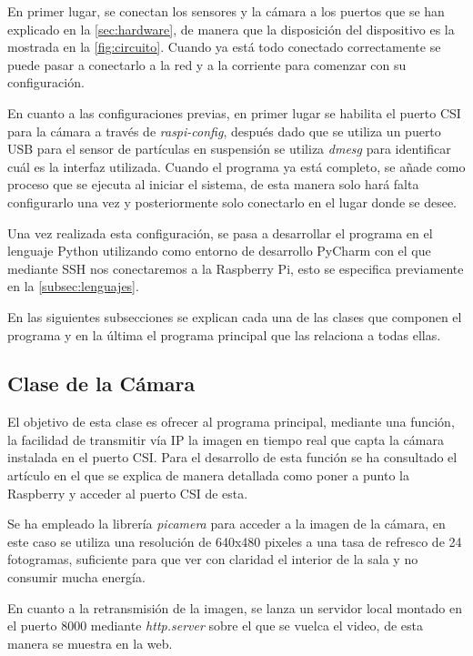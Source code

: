En primer lugar, se conectan los sensores y la cámara a los puertos que se han explicado en la \autoref{sec:hardware}, de manera que la disposición del dispositivo es la mostrada en la \autoref{fig:circuito}. Cuando ya está todo conectado correctamente se puede pasar a conectarlo a la red y a la corriente para comenzar con su configuración.

En cuanto a las configuraciones previas, en primer lugar se habilita el puerto CSI para la cámara a través de \textit{raspi-config}, después dado que se utiliza un puerto USB para el sensor de partículas en suspensión se utiliza \textit{dmesg} para identificar cuál es la interfaz utilizada. Cuando el programa ya está completo, se añade como proceso que se ejecuta al iniciar el sistema, de esta manera solo hará falta configurarlo una vez y posteriormente solo conectarlo en el lugar donde se desee.
\pagebreak

Una vez realizada esta configuración, se pasa a desarrollar el programa en el lenguaje Python utilizando como entorno de desarrollo PyCharm con el que mediante SSH nos conectaremos a la Raspberry Pi, esto se especifica previamente en la \autoref{subsec:lenguajes}.

En las siguientes subsecciones se explican cada una de las clases que componen el programa y en la última el programa principal que las relaciona a todas ellas.

\subsection{Clase de la Cámara}
El objetivo de esta clase es ofrecer al programa principal, mediante una función, la facilidad de transmitir vía IP la imagen en tiempo real que capta la cámara instalada en el puerto CSI. Para el desarrollo de esta función se ha consultado el artículo \cite{noauthor_how_nodate} en el que se explica de manera detallada como poner a punto la Raspberry y acceder al puerto CSI de esta.

Se ha empleado la librería \textit{picamera} \cite{noauthor_picamera_nodate} para acceder a la imagen de la cámara, en este caso se utiliza una resolución de 640x480 pixeles a una tasa de refresco de 24 fotogramas, suficiente para que ver con claridad el interior de la sala y no consumir mucha energía. 

En cuanto a la retransmisión de la imagen, se lanza un servidor local montado en el puerto 8000 mediante \textit{http.server} sobre el que se vuelca el video, de esta manera se muestra en la web.

